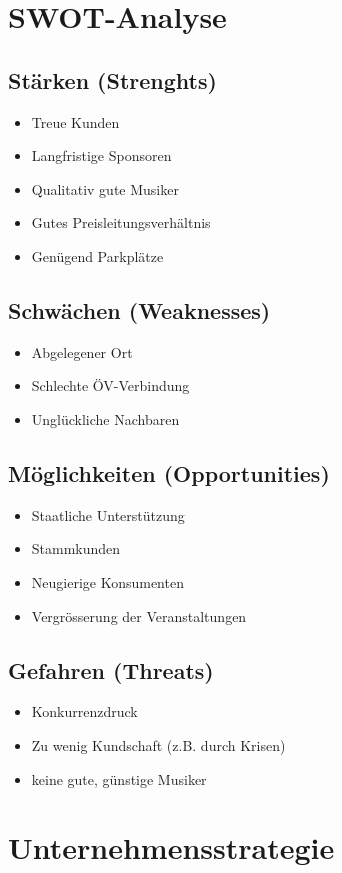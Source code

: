 \documentclass[a4paper, titlepage]{article}
\begin{document}
\section{SWOT-Analyse}
\subsection{Stärken (Strenghts)}
\begin{itemize}
  \item Treue Kunden
  \item Langfristige Sponsoren
  \item Qualitativ gute Musiker
  \item Gutes Preisleitungsverhältnis
  \item Genügend Parkplätze
\end{itemize}
\subsection{Schwächen (Weaknesses)}
\begin{itemize}
  \item Abgelegener Ort
  \item Schlechte ÖV-Verbindung
  \item Unglückliche Nachbaren
\end{itemize}
\subsection{Möglichkeiten (Opportunities)}
\begin{itemize}
  \item Staatliche Unterstützung
  \item Stammkunden
  \item Neugierige Konsumenten
  \item Vergrösserung der Veranstaltungen
\end{itemize}
\subsection{Gefahren (Threats)}
\begin{itemize}
  \item Konkurrenzdruck
  \item Zu wenig Kundschaft (z.B. durch Krisen)
  \item keine gute, günstige Musiker
\end{itemize}
\section{Unternehmensstrategie}
\end{document}
